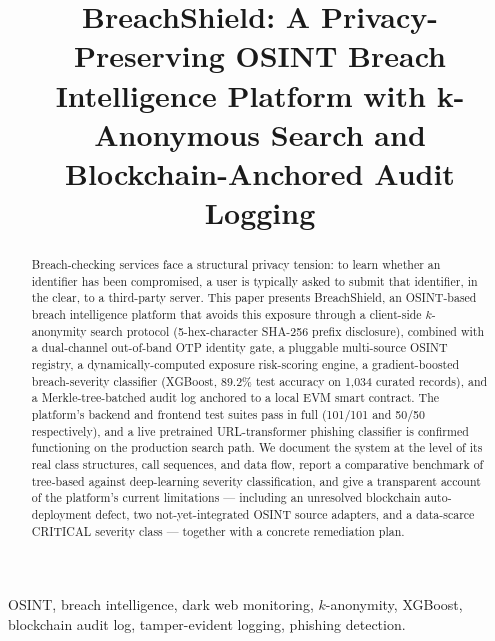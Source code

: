 \documentclass[conference]{IEEEtran}
\begin{document}
\title{BreachShield: A Privacy-Preserving OSINT Breach Intelligence Platform with k-Anonymous Search and Blockchain-Anchored Audit Logging}

\author{
\and
{}
}

\maketitle

\begin{abstract}
Breach-checking services face a structural privacy tension: to learn whether an identifier has been compromised, a user is typically asked to submit that identifier, in the clear, to a third-party server. This paper presents BreachShield, an OSINT-based breach intelligence platform that avoids this exposure through a client-side $k$-anonymity search protocol (5-hex-character SHA-256 prefix disclosure), combined with a dual-channel out-of-band OTP identity gate, a pluggable multi-source OSINT registry, a dynamically-computed exposure risk-scoring engine, a gradient-boosted breach-severity classifier (XGBoost, 89.2\% test accuracy on 1,034 curated records), and a Merkle-tree-batched audit log anchored to a local EVM smart contract. The platform's backend and frontend test suites pass in full (101/101 and 50/50 respectively), and a live pretrained URL-transformer phishing classifier is confirmed functioning on the production search path. We document the system at the level of its real class structures, call sequences, and data flow, report a comparative benchmark of tree-based against deep-learning severity classification, and give a transparent account of the platform's current limitations --- including an unresolved blockchain auto-deployment defect, two not-yet-integrated OSINT source adapters, and a data-scarce CRITICAL severity class --- together with a concrete remediation plan.
\end{abstract}

\begin{IEEEkeywords}
OSINT, breach intelligence, dark web monitoring, $k$-anonymity, XGBoost, blockchain audit log, tamper-evident logging, phishing detection.
\end{IEEEkeywords}
\end{document}
